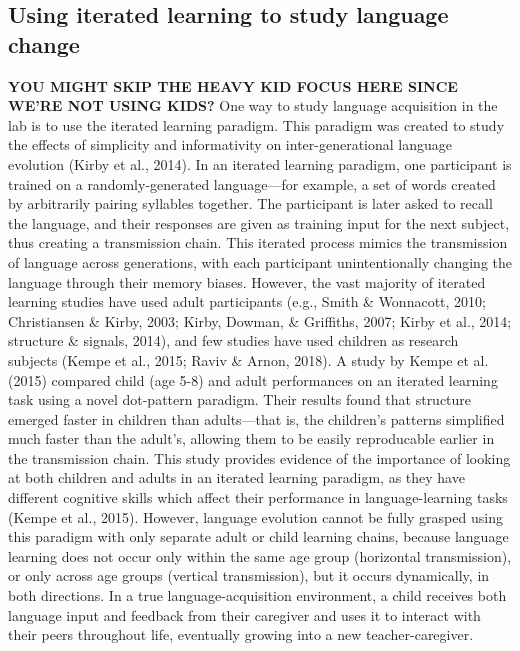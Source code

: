 \documentclass[10pt, letterpaper]{article}
\begin{document}
\hypertarget{using-iterated-learning-to-study-language-change}{%
\subsection{Using iterated learning to study language
change}\label{using-iterated-learning-to-study-language-change}}

\textbf{YOU MIGHT SKIP THE HEAVY KID FOCUS HERE SINCE WE'RE NOT USING
KIDS?} One way to study language acquisition in the lab is to use the
iterated learning paradigm. This paradigm was created to study the
effects of simplicity and informativity on inter-generational language
evolution (Kirby et al., 2014). In an iterated learning paradigm, one
participant is trained on a randomly-generated language---for example, a
set of words created by arbitrarily pairing syllables together. The
participant is later asked to recall the language, and their responses
are given as training input for the next subject, thus creating a
transmission chain. This iterated process mimics the transmission of
language across generations, with each participant unintentionally
changing the language through their memory biases. However, the vast
majority of iterated learning studies have used adult participants
(e.g., Smith \& Wonnacott, 2010; Christiansen \& Kirby, 2003; Kirby,
Dowman, \& Griffiths, 2007; Kirby et al., 2014; structure \& signals,
2014), and few studies have used children as research subjects (Kempe et
al., 2015; Raviv \& Arnon, 2018). A study by Kempe et al. (2015)
compared child (age 5-8) and adult performances on an iterated learning
task using a novel dot-pattern paradigm. Their results found that
structure emerged faster in children than adults---that is, the
children's patterns simplified much faster than the adult's, allowing
them to be easily reproducable earlier in the transmission chain. This
study provides evidence of the importance of looking at both children
and adults in an iterated learning paradigm, as they have different
cognitive skills which affect their performance in language-learning
tasks (Kempe et al., 2015). However, language evolution cannot be fully
grasped using this paradigm with only separate adult or child learning
chains, because language learning does not occur only within the same
age group (horizontal transmission), or only across age groups (vertical
transmission), but it occurs dynamically, in both directions. In a true
language-acquisition environment, a child receives both language input
and feedback from their caregiver and uses it to interact with their
peers throughout life, eventually growing into a new teacher-caregiver.
\end{document}
